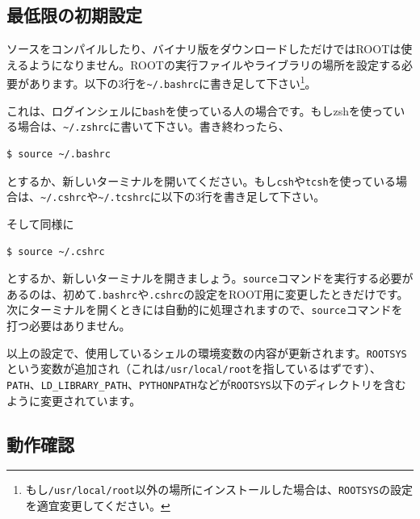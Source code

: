 \subsection{最低限の初期設定}
\label{subsec_settings}
ソースをコンパイルしたり、バイナリ版をダウンロードしただけではROOTは使えるようになりません。ROOTの実行ファイルやライブラリの場所を設定する必要があります。以下の3行を\texttt{\~{}/.bashrc}に書き足して下さい\footnote{もし\texttt{/usr/local/root}以外の場所にインストールした場合は、\texttt{ROOTSYS}の設定を適宜変更してください。}。
\begin{NoFloat}

\end{NoFloat}
これは、ログインシェルに\texttt{bash}を使っている人の場合です。もしzshを使っている場合は、\texttt{\~{}/.zshrc}に書いて下さい。書き終わったら、
\begin{lstlisting}[language=bash]
$ source ~/.bashrc
\end{lstlisting}
とするか、新しいターミナルを開いてください。もし\texttt{csh}や\texttt{tcsh}を使っている場合は、\texttt{\~{}/.cshrc}や\texttt{\~{}/.tcshrc}に以下の3行を書き足して下さい。
\begin{NoFloat}

\end{NoFloat}
そして同様に
\begin{lstlisting}[language=bash]
$ source ~/.cshrc
\end{lstlisting}
とするか、新しいターミナルを開きましょう。\texttt{source}コマンドを実行する必要があるのは、初めて\texttt{.bashrc}や\texttt{.cshrc}の設定をROOT用に変更したときだけです。次にターミナルを開くときには自動的に処理されますので、\texttt{source}コマンドを打つ必要はありません。

以上の設定で、使用しているシェルの環境変数の内容が更新されます。\texttt{ROOTSYS}という変数が追加され（これは\texttt{/usr/local/root}を指しているはずです）、\texttt{PATH}、\texttt{LD\_LIBRARY\_PATH}、\texttt{PYTHONPATH}などが\texttt{ROOTSYS}以下のディレクトリを含むように変更されています。

\subsection{動作確認}

